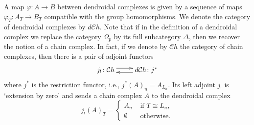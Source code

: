\documentclass[a4paper]{amsart}
\theoremstyle{plain}
\theoremstyle{definition}
\theoremstyle{remark}
\newcommand{\rpd}{\Omega_p}
\newcommand{\Ch}{\mathcal{C}h}
\newcommand{\dCh}{d\mathcal{C}h}
\numberwithin{equation}{section}
\numberwithin{figure}{section}
\begin{document}
A map $\varphi\colon A\longrightarrow B$ between dendroidal complexes is given by a sequence of maps $\varphi_T\colon A_T\longrightarrow B_T$
compatible with the group homomorphisms. We denote the category of dendroidal complexes by $d\Ch$. Note
that if in the definition of a dendroidal complex we replace the category $\rpd$ by its full subcategory $\Delta$,
then we recover the notion of a chain complex. In fact, if we denote by $\Ch$ the category of chain complexes, then there is a pair of
adjoint functors
\begin{equation}
\xymatrix{
j_!\colon \Ch \ar@<3pt>[r] & \ar@<3pt>[l] \dCh\colon j^*
}
\label{dChadj}
\end{equation}
where $j^*$ is the restriction functor, i.e., $j^*(A)_n=A_{L_n}$. Its left adjoint $j_!$ is `extension by zero' and sends a chain complex
$A$ to the dendroidal complex
$$
j_!(A)_T=\left\{
\begin{array}{cc}
A_n & \mbox{ if $T\cong L_n$}, \\
\emptyset & \mbox{ otherwise}.
\end{array}
\right.
$$
\end{document}
